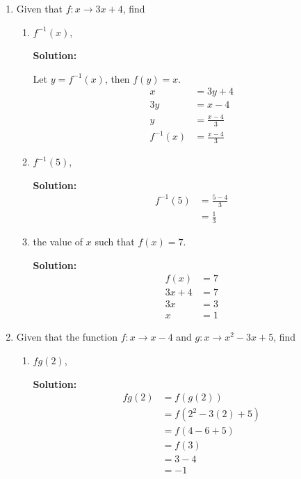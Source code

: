 \documentclass{report}
\newcommand{\sol}{\textbf{Solution:}}
\begin{document}
\begin{enumerate}[leftmargin=*]
    \item Given that $f: x \rightarrow 3 x+4$, find

          \begin{enumerate}
              \item $f^{-1}(x)$,

                    \sol{}

                    Let $y = f^{-1}(x)$, then $f(y) = x$.
                    \begin{align*}
                        x         & = 3y + 4        \\
                        3y        & = x - 4         \\
                        y         & = \frac{x-4}{3} \\
                        f^{-1}(x) & = \frac{x-4}{3}
                    \end{align*}

              \item $f^{-1}(5)$,

                    \sol{}
                    \begin{align*}
                        f^{-1}(5) & = \frac{5-4}{3} \\
                                  & = \frac{1}{3}
                    \end{align*}

              \item the value of $x$ such that $f(x)=7$.

                    \sol{}
                    \begin{align*}
                        f(x) & = 7 \\
                        3x+4 & = 7 \\
                        3x   & = 3 \\
                        x    & = 1
                    \end{align*}
          \end{enumerate}

    \item Given that the function $f: x \rightarrow x-4$ and $g: x \rightarrow x^2-3
              x+5$, find
          \begin{enumerate}
              \item $f g(2)$,

                    \sol{}
                    \begin{align*}
                        f g(2) & = f(g(2))       \\
                               & = f(2^2-3(2)+5) \\
                               & = f(4-6+5)      \\
                               & = f(3)          \\
                               & = 3-4           \\
                               & = -1
                    \end{align*}


\end{enumerate}
\end{enumerate}
\end{document}
